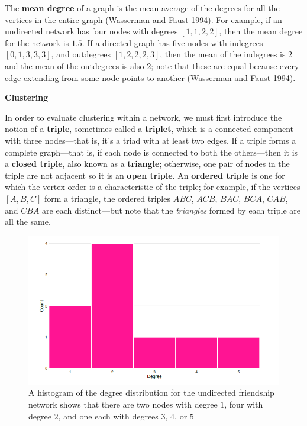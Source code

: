 \documentclass{book}
\begin{document}
The \textbf{mean degree} of a graph is the mean average of the degrees for all
the vertices in the entire graph
(\protect\hyperlink{ref-WassermanFaust1994}{Wasserman and Faust 1994}). For
example, if an undirected network has four nodes with degrees
\([1, 1, 2, 2]\), then the mean degree for the network is \(1.5\). If a
directed graph has five nodes with indegrees \([0, 1, 3, 3, 3]\), and
outdegrees \([1, 2, 2, 2, 3]\), then the mean of the indegrees is \(2\) and
the mean of the outdegrees is also \(2\); note that these are equal because
every edge extending from some node points to another
(\protect\hyperlink{ref-WassermanFaust1994}{Wasserman and Faust 1994}).

\textbf{Clustering}

In order to evaluate clustering within a network, we must first introduce the
notion of a \textbf{triple}, sometimes called a \textbf{triplet}, which is a
connected component with three nodes---that is, it's a triad with at least two
edges. If a triple forms a complete graph---that is, if each node is connected
to both the others---then it is a \textbf{closed triple}, also known as a
\textbf{triangle}; otherwise, one pair of nodes in the triple are not adjacent
so it is an \textbf{open triple}. An \textbf{ordered triple} is one for which
the vertex order is a characteristic of the triple; for example, if the
vertices \([A, B, C]\) form a triangle, the ordered triples \(ABC\), \(ACB\),
\(BAC\), \(BCA\), \(CAB\), and \(CBA\) are each distinct---but note that the
\emph{triangles} formed by each triple are all the same.

\begin{figure}
\hypertarget{fig:fig11-9}{%
\centering
\includegraphics{images/social-networks/11-9.png}
\caption{A histogram of the degree distribution for the undirected friendship
network shows that there are two nodes with degree \(1\), four with degree
\(2\), and one each with degrees \(3\), \(4\), or \(5\)}\label{fig:fig11-9}
}
\end{figure}
\end{document}
